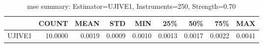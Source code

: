 \begin{table}[ht]
\centering
\caption{mse summary: Estimator=UJIVE1, Instruments=250, Strength=0.70}
\begin{tabular}{lrrrrrrrr}
\toprule
 & COUNT & MEAN & STD & MIN & 25\% & 50\% & 75\% & MAX \\
\midrule
UJIVE1 & 10.0000 & 0.0019 & 0.0009 & 0.0010 & 0.0013 & 0.0017 & 0.0022 & 0.0041 \\
\bottomrule
\end{tabular}
\end{table}
